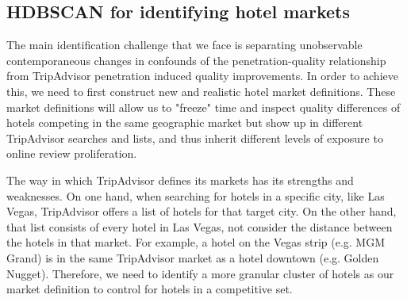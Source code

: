 \documentclass[mksc,blindrev]{informs3} %
\begin{document}

\subsection{HDBSCAN for identifying hotel markets}\label{sec:hdbscan}
The main identification challenge that we face is separating unobservable contemporaneous changes in confounds of the penetration-quality relationship from TripAdvisor penetration induced quality improvements. In order to achieve this, we need to first construct new and realistic hotel market definitions. These market definitions will allow us to "freeze" time and inspect quality differences of hotels competing in the same geographic market but show up in different TripAdvisor searches and lists, and thus inherit different levels of exposure to online review proliferation.

The way in which TripAdvisor defines its markets has its strengths and weaknesses. On one hand, when searching for hotels in a specific city, like Las Vegas, TripAdvisor offers a list of hotels for that target city. On the other hand, that list consists of every hotel in Las Vegas, not consider the distance between the hotels in that market. For example, a hotel on the Vegas strip (e.g. MGM Grand) is in the same TripAdvisor market as a hotel downtown (e.g. Golden Nugget). Therefore, we need to identify a more granular cluster of hotels as our market definition to control for hotels in a competitive set.
\end{document}
